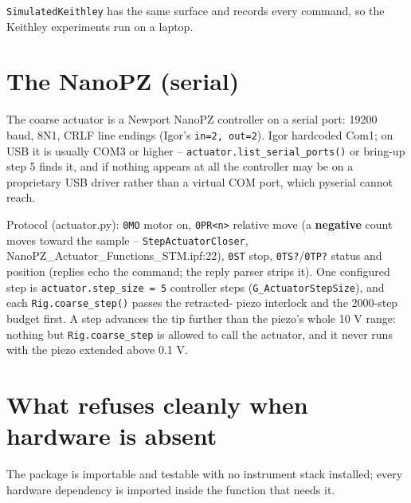 \texttt{Simulated\discretionary{}{}{}Keithley} has the same surface and records every command, so the Keithley experiments run on a laptop.

\section{The NanoPZ (serial)}

The coarse actuator is a Newport NanoPZ controller on a serial port: 19200 baud, 8N1, CRLF line endings (Igor's \texttt{in=2,\discretionary{}{}{} out=2}). Igor hardcoded Com1; on USB it is usually COM3 or higher -- \texttt{actuator.\discretionary{}{}{}list\_\discretionary{}{}{}serial\_\discretionary{}{}{}ports()} or bring-up step 5 finds it, and if nothing appears at all the controller may be on a proprietary USB driver rather than a virtual COM port, which pyserial cannot reach.

Protocol (actuator.py): \texttt{0MO} motor on, \texttt{0PR<n>} relative move (a \textbf{negative} count moves toward the sample -- \texttt{Step\discretionary{}{}{}Actuator\discretionary{}{}{}Closer}, NanoPZ\_Actuator\_Functions\_STM.ipf:22), \texttt{0ST} stop, \texttt{0TS?}/\texttt{0TP?} status and position (replies echo the command; the reply parser strips it). One configured step is \texttt{actuator.\discretionary{}{}{}step\_\discretionary{}{}{}size = 5} controller steps (\texttt{G\_\discretionary{}{}{}Actuator\discretionary{}{}{}Step\discretionary{}{}{}Size}), and each \texttt{Rig.\discretionary{}{}{}coarse\_\discretionary{}{}{}step()} passes the retracted- piezo interlock and the 2000-step budget first. A step advances the tip further than the piezo's whole 10 V range: nothing but \texttt{Rig.\discretionary{}{}{}coarse\_\discretionary{}{}{}step} is allowed to call the actuator, and it never runs with the piezo extended above 0.1 V.

\section{What refuses cleanly when hardware is absent}

The package is importable and testable with no instrument stack installed; every hardware dependency is imported inside the function that needs it.

